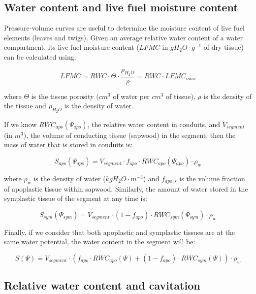 \documentclass[]{book}
\begin{document}
\subsection{Water content and live fuel moisture
content}\label{water-content-and-live-fuel-moisture-content}

Pressure-volume curves are useful to determine the moisture content of
live fuel elements (leaves and twigs). Given an average relative water
content of a water compartment, its live fuel moisture content (\(LFMC\)
in \(g H_2O \cdot g^{-1}\) of dry tissue) can be calculated using:

\begin{equation}
LFMC = RWC \cdot \Theta \cdot \frac{\rho_{H_2O}}{\rho} = RWC \cdot LFMC_{max}
\end{equation}

where \(\Theta\) is the tissue porosity (\(cm^3\) of water per \(cm^3\)
of tissue), \(\rho\) is the density of the tissue and \(\rho_{H_2O}\) is
the density of water.

If we know \(RWC_{apo}(\Psi_{apo})\), the relative water content in
conduits, and \(V_{segment}\) (in \(m^3\)), the volume of conducting
tissue (sapwood) in the segment, then the mass of water that is stored
in conduits is:

\begin{equation}
S_{apo}(\Psi_{apo}) = V_{segment} \cdot f_{apo} \cdot RWC_{apo}(\Psi_{apo}) \cdot \rho_{w}
\end{equation}

where \(\rho_{w}\) is the density of water (\(kgH_2O \cdot m^{-3}\)) and
\(f_{apo,s}\) is the volume fraction of apoplastic tissue within
sapwood. Similarly, the amount of water stored in the symplastic tissue
of the segment at any time is:

\begin{equation}
S_{sym}(\Psi_{sym}) = V_{segment} \cdot (1 - f_{apo}) \cdot RWC_{sym}(\Psi_{sym}) \cdot \rho_{w}
\end{equation}

Finally, if we consider that both apoplastic and symplastic tissues are
at the same water potential, the water content in the segment will be:

\begin{equation}
S(\Psi) = V_{segment} \cdot (f_{apo} \cdot RWC_{apo}(\Psi) + (1 - f_{apo}) \cdot RWC_{sym}(\Psi)) \cdot \rho_{w}
\end{equation}

\subsection{Relative water content and
cavitation}\label{relative-water-content-and-cavitation}
\end{document}
